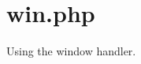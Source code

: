 \hypertarget{win_8php-example}{
\section{win.php}
}
Using the window handler.


\begin{DoxyCodeInclude}
\end{DoxyCodeInclude}
 
